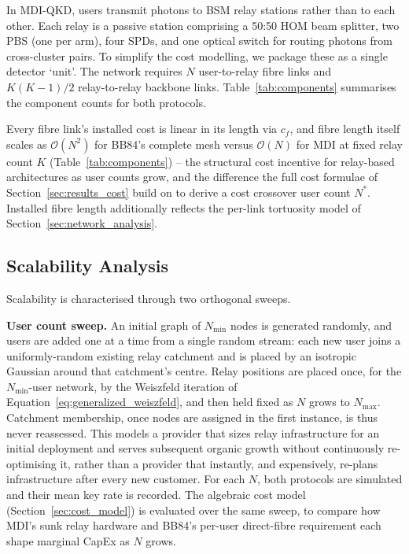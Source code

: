 \documentclass[12pt]{article}
\begin{document}
In MDI-QKD, users transmit photons to BSM relay stations rather than to each other. Each relay is a passive station comprising a 50:50 HOM beam splitter, two PBS (one per arm), four SPDs, and one optical switch for routing photons from cross-cluster pairs. To simplify the cost modelling, we package these as a single detector `unit'. The network requires $N$ user-to-relay fibre links and $K(K-1)/2$ relay-to-relay backbone links. Table~\ref{tab:components} summarises the component counts for both protocols.

Every fibre link's installed cost is linear in its length via $c_f$, and fibre length itself scales as $\mathcal{O}(N^2)$ for BB84's complete mesh versus $\mathcal{O}(N)$ for MDI at fixed relay count $K$ (Table~\ref{tab:components}) -- the structural cost incentive for relay-based architectures as user counts grow, and the difference the full cost formulae of Section~\ref{sec:results_cost} build on to derive a cost crossover user count $N^*$. Installed fibre length additionally reflects the per-link tortuosity model of Section~\ref{sec:network_analysis}.

\subsection{Scalability Analysis}
\label{sec:scalability}

Scalability is characterised through two orthogonal sweeps.

\textbf{User count sweep.} An initial graph of $N_\text{min}$ nodes is generated randomly, and users are added one at a time from a single random stream: each new user joins a uniformly-random existing relay catchment and is placed by an isotropic Gaussian around that catchment's centre. Relay positions are placed once, for the $N_\text{min}$-user network, by the Weiszfeld iteration of Equation~\ref{eq:generalized_weiszfeld}, and then held fixed as $N$ grows to $N_\text{max}$. Catchment membership, once nodes are assigned in the first instance, is thus never reassessed. This models a provider that sizes relay infrastructure for an initial deployment and serves subsequent organic growth without continuously re-optimising it, rather than a provider that instantly, and expensively, re-plans infrastructure after every new customer. For each $N$, both protocols are simulated and their mean key rate is recorded. The algebraic cost model (Section~\ref{sec:cost_model}) is evaluated over the same sweep, to compare how MDI's sunk relay hardware and BB84's per-user direct-fibre requirement each shape marginal CapEx as $N$ grows.
\end{document}

